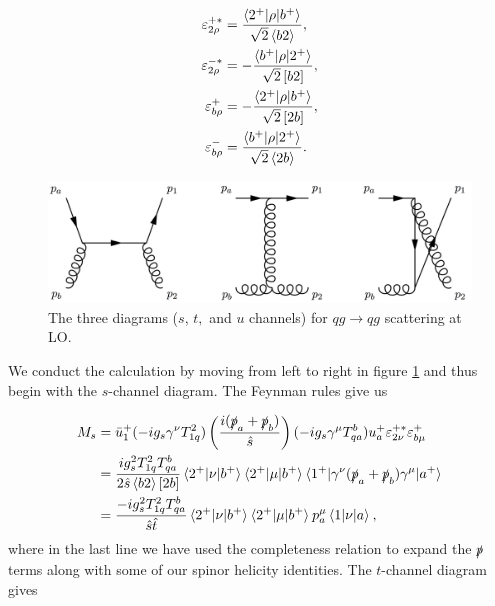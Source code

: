 \begin{subequations}
\begin{align}
\varepsilon_{2 \rho}^{+*} &= \frac{\mathinner{\langle2^+\vert\rho\vert b^+\rangle}_{}}{\sqrt{2} \left< b 2 \right>},\\
\varepsilon_{2 \rho}^{-*} &= -\frac{\mathinner{\langle b^+\vert\rho\vert2^+\rangle}_{}}{\sqrt{2} \left[ b 2 \right]}, \\
\varepsilon_{b \rho}^{+} &= -\frac{\mathinner{\langle2^+\vert\rho\vert b^+\rangle}_{}}{\sqrt{2} \left [ 2 b \right]}, \\
\varepsilon_{b \rho}^{-} &= \frac{\mathinner{\langle b^+\vert\rho\vert2^+\rangle}_{}}{\sqrt{2} \left< 2 b \right>}.
\end{align}
\end{subequations}

\begin{figure}[t]
\centering
\includegraphics[scale=0.25]{Images/qg_qg_scattering.png} 
\caption{The three diagrams ($s$, $t,$ and $u$ channels) for $qg \to qg$ scattering at LO.}
\label{fig:qg_qg_scat}
\end{figure}

We conduct the calculation by moving from left to right in figure \ref{fig:qg_qg_scat} and thus begin with the $s$-channel diagram. The Feynman rules give us 

\begin{equation}
\begin{split}
M_s &= \bar{u}^+_1 (- i g_s \gamma^\nu T^2_{1q}) \left( \frac{i(\slashed{p}_a + \slashed{p}_b)}{\hat{s}}\right)(- ig_s \gamma^\mu T^b_{qa}) u_a^+ \varepsilon_{2 \nu}^{+*} \varepsilon_{b \mu}^+ \\
&= \frac{i g_s^2 T^2_{1q}T^b_{qa}}{2 \hat{s} \left<b 2 \right> [2b]} \mathinner{\langle2^+\vert\nu\vert b^+\rangle}_{} \mathinner{\langle2^+\vert\mu\vert b^+\rangle}_{} \mathinner{\langle1^+\vert\gamma^\nu (\slashed{p}_a + \slashed{p}_b) \gamma^\mu\vert a^+\rangle}_{} \\
&= \frac{-i g_s^2 T^2_{1q}T^b_{qa}}{\hat{s} \hat{t}} \mathinner{\langle2^+\vert\nu\vert b^+\rangle}_{} \mathinner{\langle2^+\vert\mu\vert b^+\rangle}_{} p_a^\mu \mathinner{\langle1\vert\nu\vert a\rangle}_{},
\end{split}
\end{equation}
where in the last line we have used the completeness relation to expand the $\slashed{p}$ terms along with some of our spinor helicity identities. The $t$-channel diagram gives

